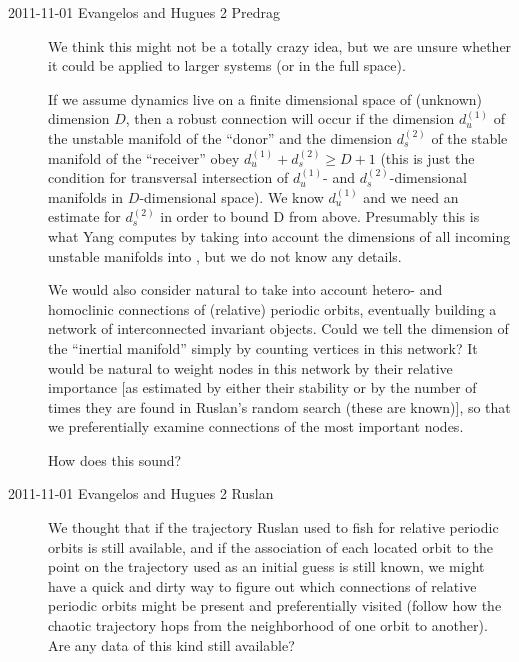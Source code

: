 \begin{description}
\item[2011-11-01 Evangelos and Hugues 2 Predrag] We think this might not be a totally
crazy idea, but we are unsure whether it could be applied to larger systems (or in the
full space). 

If we assume dynamics live on a finite dimensional space of (unknown) dimension $D$,
then a robust connection will occur if the dimension $d_u^{(1)}$ of the unstable manifold of
the ``donor''  and the dimension $d_s^{(2)}$ of the stable manifold of the ``receiver''  
obey $d_u^{(1)}+d_s^{(2)} \geq D+1$ (this is just the condition for transversal intersection of
$d_u^{(1)}$- and $d_s^{(2)}$-dimensional manifolds in $D$-dimensional space). 
We know $d_u^{(1)}$ and 
we need an estimate for  $d_s^{(2)}$ in order to bound D from above. Presumably this is
what Yang computes by taking into account the dimensions of all incoming unstable manifolds into ,
but we do not know any details.

We would also consider natural to take into account hetero- and
homoclinic connections of (relative) periodic orbits, eventually building a network of interconnected invariant
objects. Could we tell the dimension of the ``inertial manifold'' simply by counting vertices in this
network? It would be natural to weight nodes in this network by their relative importance [as estimated by
either their stability or by the number of times they are found in Ruslan's random search (these are known)], 
so that we preferentially examine connections of the most important nodes.

How does this sound?

\item[2011-11-01 Evangelos and Hugues 2 Ruslan] We thought that if the trajectory Ruslan used to fish for 
relative periodic orbits is still available, and if the association of each located orbit to the point on the 
trajectory used as an initial guess is still known, we might have a quick and dirty way to figure out which connections
of relative periodic orbits might be present and preferentially visited (follow how the chaotic trajectory 
hops from the neighborhood of one orbit to another). Are any data of this kind still available?

\end{description}
